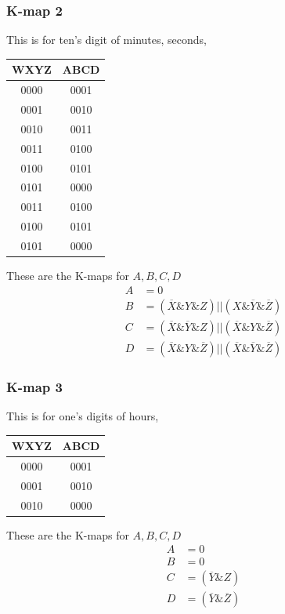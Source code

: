 \documentclass[a4paper,12pt]{article}
\begin{document}
\subsubsection*{K-map 2}
This is for ten's digit of minutes, seconds, \newline \newline
\begin{tabular}{|c|c|}
\hline
WXYZ & ABCD \\
\hline
0000 & 0001 \\
0001 & 0010 \\
0010 & 0011 \\
0011 & 0100 \\
0100 & 0101 \\
0101 & 0000 \\0011 & 0100 \\
0100 & 0101 \\
0101 & 0000 \\
\hline
\end{tabular}
\newline
\newline These are the K-maps for $A, B, C, D$
\begin{align*}
A &= 0 \\
B &= (\overline{X} \& Y \& Z) || (X \& \overline{Y} \& \overline{Z}) \\
C &= (\overline{X} \& \overline{Y} \& Z) || (\overline{X} \& Y \& \overline{Z}) \\
D &= (\overline{X} \& Y \& \overline{Z}) || (\overline{X}\& \overline{Y} \& \overline{Z})
\end{align*}
\subsubsection*{K-map 3}
This is for one's digits of hours, \newline \newline
\begin{tabular}{|c|c|}
\hline
WXYZ & ABCD \\
\hline
0000 & 0001 \\
0001 & 0010 \\
0010 & 0000 \\
\hline
\end{tabular}
\newline
\newline These are the K-maps for $A, B, C, D$
\begin{align*}
A &= 0 \\
B &= 0 \\
C &= (\overline{Y} \& Z) \\
D &= (\overline{Y} \& \overline{Z})
\end{align*}
\end{document}
